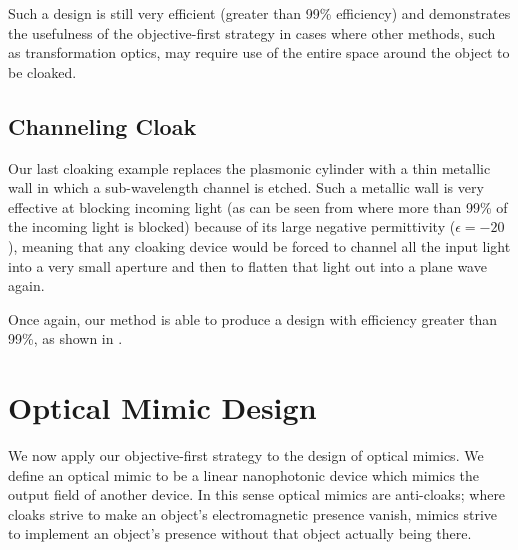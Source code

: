 Such a design is still very efficient (greater than 99\% efficiency)
    and demonstrates the usefulness of the objective-first strategy
    in cases where other methods, such as transformation optics,
    may require use of the entire space around the object
    to be cloaked.
    
    

\subsection{Channeling Cloak}

Our last cloaking example replaces the plasmonic cylinder 
    with a thin metallic wall in which a sub-wavelength channel is etched.
Such a metallic wall is very effective at blocking incoming light
    (as can be seen from  where more than 99\%
    of the incoming light is blocked) 
    because of its large negative permittivity ($\epsilon = -20$),
    meaning that any cloaking device would be forced to channel
    all the input light into a very small aperture
    and then to flatten that light out into a plane wave again.

Once again, our method is able to produce a design with efficiency greater
    than 99\%, as shown in .
                
                
                
\section{Optical Mimic Design}
\label{sec:mimic}
                
We now apply our objective-first strategy to the design of optical mimics.
We define an optical mimic to be a linear nanophotonic device which 
    mimics the output field of another device.
In this sense optical mimics are anti-cloaks;
    where cloaks strive to make an object's electromagnetic presence vanish,
    mimics strive to implement an object's presence without that 
    object actually being there.

